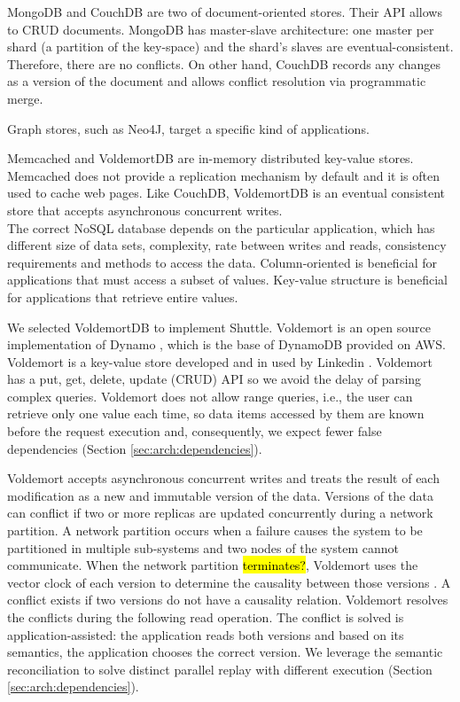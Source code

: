 MongoDB and CouchDB are two of document-oriented stores. Their \ac{API} allows to \acf{CRUD} documents. MongoDB has master-slave architecture: one master per shard (a partition of the key-space) and the shard's slaves are eventual-consistent. Therefore, there are no conflicts. On other hand, CouchDB records any changes as a version of the document and allows conflict resolution via programmatic merge. 

Graph stores, such as Neo4J, target a specific kind of applications.

Memcached and VoldemortDB are in-memory distributed key-value stores. Memcached does not provide a replication mechanism by default and it is often used to cache web pages. Like CouchDB, VoldemortDB is an eventual consistent store that accepts asynchronous concurrent writes.\\

The correct \acs{NoSQL} database depends on the particular application, which has different size of data sets, complexity, rate between writes and reads, consistency requirements and methods to access the data. Column-oriented is beneficial for applications that must access a subset of values. Key-value structure is beneficial for applications that retrieve entire values. 

We selected VoldemortDB \cite{Kreps} to implement Shuttle. Voldemort is an open source implementation of Dynamo \cite{Decandia2007}, which is the base of DynamoDB provided on \acf{AWS}. Voldemort is a key-value store developed and in used by Linkedin \cite{linkedin}. Voldemort has a put, get, delete, update (\ac{CRUD}) \ac{API} so we avoid the delay of parsing complex queries. Voldemort does not allow range queries, i.e., the user can retrieve only one value each time, so data items accessed by them are known before the request execution and, consequently, we expect fewer false dependencies (Section \ref{sec:arch:dependencies}). 


Voldemort accepts asynchronous concurrent writes and treats the result of each modification as a new and immutable version of the data. Versions of the data can conflict if two or more replicas are updated concurrently during a network partition. A network partition occurs when a failure causes the system to be partitioned in multiple sub-systems and two nodes of the system cannot communicate. When the network partition \hl{terminates?}, Voldemort uses the vector clock of each version to determine the causality between those versions \cite{Decandia2007}. A conflict exists if two versions do not have a causality relation. Voldemort resolves the conflicts during the following read operation. The conflict is solved is application-assisted: the application reads both versions and based on its semantics, the application chooses the correct version. We leverage the semantic reconciliation to solve distinct parallel replay with different execution (Section \ref{sec:arch:dependencies}).

